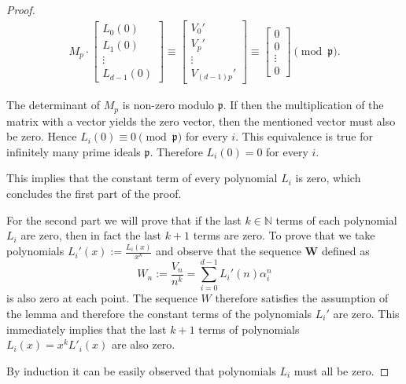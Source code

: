\documentclass[preprint,12pt]{elsarticle}
\newcommand{\N}{\mathbb{N}}
\newcommand{\pp}{\mathfrak{p} }
\begin{document}
\begin{proof}
    \begin{align}
        M_p
        \cdot
         \begin{bmatrix}
           L_0(0) \\ L_1(0) \\ \vdots \\ L_{d-1}(0)
        \end{bmatrix}
        \equiv
          \begin{bmatrix}
           {V}_{0}' \\ {V}_{p}' \\ \vdots \\ {V}_{(d-1)p}' 
        \end{bmatrix}
         \equiv
          \begin{bmatrix}
           0 \\ 0 \\ \vdots \\ 0
        \end{bmatrix}
        \pmod \pp.
    \end{align}

   The determinant of $M_p$ is non-zero modulo $\pp$. If then the multiplication of the matrix with a vector yields the zero vector, then the mentioned vector must also be zero. Hence $L_i(0) \equiv 0\pmod\pp$ for every $i$. This equivalence is true for infinitely many prime ideals $\pp$. Therefore $L_i(0) = 0$ for every $i$. 


    This implies that the constant term of every polynomial $L_i$ is zero, which concludes the first part of the proof. 

   
    For the second part we will prove that if the last $k\in\N$ terms of each polynomial $L_i$ are zero, then in fact the last $k+1$ terms are zero.  To prove that we take polynomials $L_i'(x) := \frac{L_i(x)}{x^k}$ and observe that the sequence $\mathbf{W}$ defined as 
    $$ {W}_n := \frac{{V}_n}{n^k} =  \sum_{i=0}^{d-1}L_i'(n)\alpha_i^n $$
    is also zero at each point. The sequence ${W}$ therefore satisfies the assumption of the lemma and therefore the constant terms of the polynomials $L_i'$ are zero. This immediately implies that the last $k+1$ terms of polynomials $L_i(x) = x^kL'_i(x)$ are also zero.

    By induction it can be easily observed that polynomials $L_i$ must all be zero.    
    


\end{proof}
\end{document}
